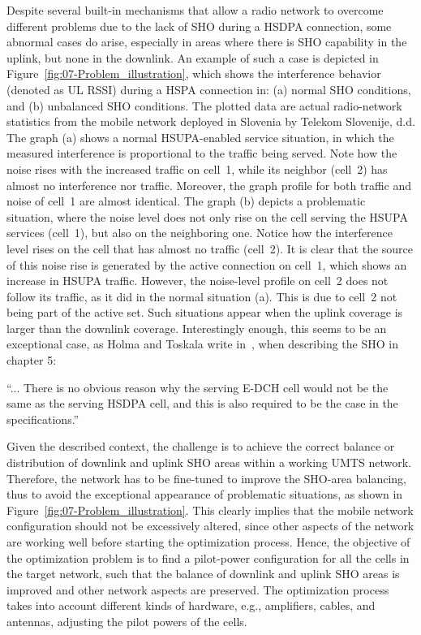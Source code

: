 Despite several built-in mechanisms that allow a radio network to
overcome different problems due to the lack of SHO during a HSDPA
connection, some abnormal cases do arise, especially in areas where
there is SHO capability in the uplink, but none in the downlink. An
example of such a case is depicted in Figure~\ref{fig:07-Problem_illustration},
which shows the interference behavior (denoted as UL RSSI) during
a HSPA connection in: (a) normal SHO conditions, and (b) unbalanced
SHO conditions. The plotted data are actual radio-network statistics
from the mobile network deployed in Slovenia by Telekom Slovenije,
d.d. The graph (a) shows a normal HSUPA-enabled service situation,
in which the measured interference is proportional to the traffic
being served. Note how the noise rises with the increased traffic
on cell~1, while its neighbor (cell~2) has almost no interference
nor traffic. Moreover, the graph profile for both traffic and noise
of cell~1 are almost identical. The graph (b) depicts a problematic
situation, where the noise level does not only rise on the cell serving
the HSUPA services (cell~1), but also on the neighboring one. Notice
how the interference level rises on the cell that has almost no traffic
(cell~2). It is clear that the source of this noise rise is generated
by the active connection on cell~1, which shows an increase in HSUPA
traffic. However, the noise-level profile on cell~2 does not follow
its traffic, as it did in the normal situation (a). This is due to
cell~2 not being part of the active set. Such situations appear when
the uplink coverage is larger than the downlink coverage. Interestingly
enough, this seems to be an exceptional case, as Holma and Toskala
write in~\cite{holma2006hsdpa}, when describing the SHO in chapter
5:

``... There is no obvious reason why the serving E-DCH cell would
not be the same as the serving HSDPA cell, and this is also required
to be the case in the specifications.''

Given the described context, the challenge is to achieve the correct
balance or distribution of downlink and uplink SHO areas within a
working UMTS network. Therefore, the network has to be fine-tuned
to improve the SHO-area balancing, thus to avoid the exceptional appearance
of problematic situations, as shown in Figure~\ref{fig:07-Problem_illustration}.
This clearly implies that the mobile network configuration should
not be excessively altered, since other aspects of the network are
working well before starting the optimization process. Hence, the
objective of the optimization problem is to find a pilot-power configuration
for all the cells in the target network, such that the balance of
downlink and uplink SHO areas is improved and other network aspects
are preserved. The optimization process takes into account different
kinds of hardware, e.g., amplifiers, cables, and antennas, adjusting
the pilot powers of the cells.

